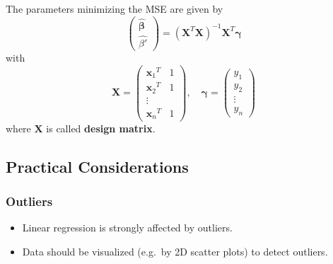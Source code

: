 
The parameters minimizing the MSE are given by
\begin{equation*}
    \begin{pmatrix}
        \hat{\boldsymbol{\beta}} \\
        \widehat{\beta'}
    \end{pmatrix}
    ={(\mathbf{X}^T \mathbf{X})}^{-1}\mathbf{X}^T\boldsymbol{\gamma}
\end{equation*}
with
\begin{equation*}
    \mathbf{X}=
    \begin{pmatrix}
        {\mathbf{x}_1}^T & 1 \\
        {\mathbf{x}_2}^T & 1 \\
        \vdots               \\
        {\mathbf{x}_n}^T & 1
    \end{pmatrix},\quad
    \boldsymbol{\gamma}=
    \begin{pmatrix}
        y_1    \\
        y_2    \\
        \vdots \\
        y_n
    \end{pmatrix}
\end{equation*}
where $\mathbf{X}$ is called \textbf{design matrix}.


\subsection{Practical Considerations}

\subsubsection{Outliers}
\begin{itemize}
    \item Linear regression is strongly affected by outliers.
    \item Data should be visualized (e.g.\ by 2D scatter plots) to detect outliers.
\end{itemize}


